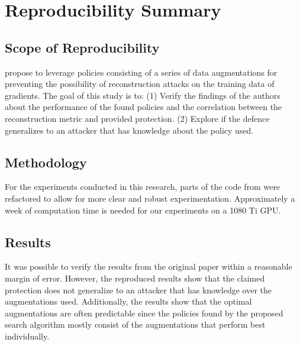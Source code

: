 \section{Reproducibility Summary}

\subsection*{Scope of Reproducibility}
\citeauthor{gao2021privacy} \cite{gao2021privacy} propose to leverage policies consisting of a series of data augmentations for preventing the possibility of reconstruction attacks on the training data of gradients. The goal of this study is to: (1) Verify the findings of the authors about the performance of the found policies and the correlation between the reconstruction metric and provided protection. (2) Explore if the defence generalizes to an attacker that has knowledge about the policy used.

\subsection*{Methodology}
For the experiments conducted in this research, parts of the code from \citeauthor{gao2021privacy} were refactored to allow for more clear and robust experimentation. Approximately a week of computation time is needed for our experiments on a 1080 Ti GPU.

\subsection*{Results}
It was possible to verify the results from the original paper within a reasonable margin of error. However, the reproduced results show that the claimed protection does not generalize to an attacker that has knowledge over the augmentations used. Additionally, the results show that the optimal augmentations are often predictable since the policies found by the proposed search algorithm mostly consist of the augmentations that perform best individually.


